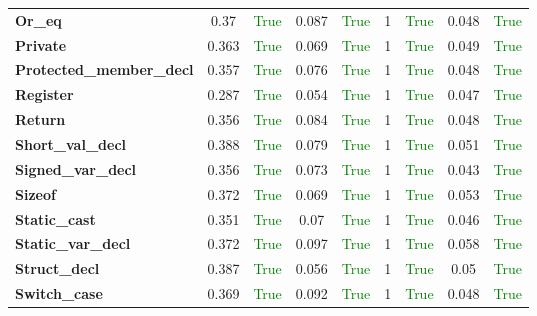 \documentclass{article}
\begin{document}
\begin{xltabular}{\textwidth}{lcccccccc}
\textbf{{\fontsize{10}{12}\selectfont Or\_eq}}& 0.37&\textcolor{green}{True}& 0.087&\textcolor{green}{True}& 1&\textcolor{green}{True}& 0.048&\textcolor{green}{True} \\[0.5ex]
\textbf{{\fontsize{10}{12}\selectfont Private}}& 0.363&\textcolor{green}{True}& 0.069&\textcolor{green}{True}& 1&\textcolor{green}{True}& 0.049&\textcolor{green}{True} \\[0.5ex]
\textbf{{\fontsize{10}{12}\selectfont Protected\_member\_decl}}& 0.357&\textcolor{green}{True}& 0.076&\textcolor{green}{True}& 1&\textcolor{green}{True}& 0.048&\textcolor{green}{True} \\[0.5ex]
\textbf{{\fontsize{10}{12}\selectfont Register}}& 0.287&\textcolor{green}{True}& 0.054&\textcolor{green}{True}& 1&\textcolor{green}{True}& 0.047&\textcolor{green}{True} \\[0.5ex]
\textbf{{\fontsize{10}{12}\selectfont Return}}& 0.356&\textcolor{green}{True}& 0.084&\textcolor{green}{True}& 1&\textcolor{green}{True}& 0.048&\textcolor{green}{True} \\[0.5ex]
\textbf{{\fontsize{10}{12}\selectfont Short\_val\_decl}}& 0.388&\textcolor{green}{True}& 0.079&\textcolor{green}{True}& 1&\textcolor{green}{True}& 0.051&\textcolor{green}{True} \\[0.5ex]
\textbf{{\fontsize{10}{12}\selectfont Signed\_var\_decl}}& 0.356&\textcolor{green}{True}& 0.073&\textcolor{green}{True}& 1&\textcolor{green}{True}& 0.043&\textcolor{green}{True} \\[0.5ex]
\textbf{{\fontsize{10}{12}\selectfont Sizeof}}& 0.372&\textcolor{green}{True}& 0.069&\textcolor{green}{True}& 1&\textcolor{green}{True}& 0.053&\textcolor{green}{True} \\[0.5ex]
\textbf{{\fontsize{10}{12}\selectfont Static\_cast}}& 0.351&\textcolor{green}{True}& 0.07&\textcolor{green}{True}& 1&\textcolor{green}{True}& 0.046&\textcolor{green}{True} \\[0.5ex]
\textbf{{\fontsize{10}{12}\selectfont Static\_var\_decl}}& 0.372&\textcolor{green}{True}& 0.097&\textcolor{green}{True}& 1&\textcolor{green}{True}& 0.058&\textcolor{green}{True} \\[0.5ex]
\textbf{{\fontsize{10}{12}\selectfont Struct\_decl}}& 0.387&\textcolor{green}{True}& 0.056&\textcolor{green}{True}& 1&\textcolor{green}{True}& 0.05&\textcolor{green}{True} \\[0.5ex]
\textbf{{\fontsize{10}{12}\selectfont Switch\_case}}& 0.369&\textcolor{green}{True}& 0.092&\textcolor{green}{True}& 1&\textcolor{green}{True}& 0.048&\textcolor{green}{True} \\[0.5ex]

\end{xltabular}
\end{document}

